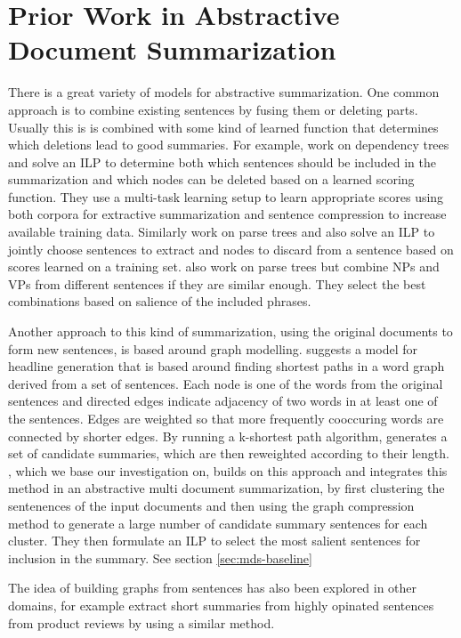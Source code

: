 \documentclass[a4paper,BCOR=10mm]{report}
\begin{document}
\section{Prior Work in Abstractive Document Summarization}

There is a great variety of models for abstractive summarization. One common approach is to combine existing sentences by fusing them or deleting parts. Usually this is is combined with some kind of learned function that determines which deletions lead to good summaries.
For example, \citet{almeida} work on dependency trees and solve an ILP to determine both which sentences should be included in the summarization and which nodes can be deleted based on a learned scoring function. They use a multi-task learning setup to learn appropriate scores using both corpora for extractive summarization and sentence compression to increase available training data. Similarly \citet{berg-kirkpatrick} work on parse trees and also solve an ILP to jointly choose sentences to extract and nodes to discard from a sentence based on scores learned on a training set.
\citet{bing} also work on parse trees but combine NPs and VPs from different sentences if they are similar enough. They select the best combinations based on salience of the included phrases.

Another approach to this kind of summarization, using the original documents to form new sentences, is based around graph modelling. \citet{filippova} suggests a model for headline generation that is based around finding shortest paths in a word graph derived from a set of sentences.
Each node is one of the words from the original sentences and directed edges indicate adjacency of two words in at least one of the sentences. Edges are weighted so that more frequently cooccuring words are connected by shorter edges. By running a k-shortest path algorithm, \citeauthor{filippova} generates a set of candidate summaries, which are then reweighted according to their length.
\citet{banerjee}, which we base our investigation on, builds on this approach and integrates this method in an abstractive multi document summarization, by first clustering the sentenences of the input documents and then using the graph compression method to generate a large number of candidate summary sentences for each cluster. They then formulate an ILP to select the most salient sentences for inclusion in the summary. See section \ref{sec:mds-baseline} 

The idea of building graphs from sentences has also been explored in other domains, for example \citet{opinosis} extract short summaries from highly opinated sentences from product reviews by using a similar method.
\end{document}
